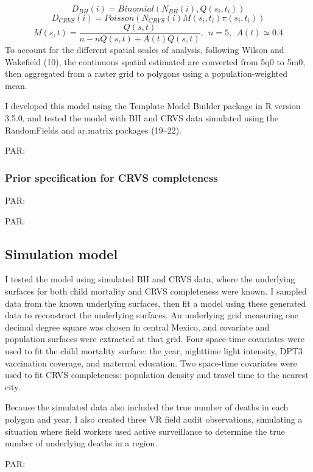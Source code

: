 \documentclass[
]{article}
\begin{document}
\[D_{BH}(i) = Binomial(N_{BH}(i), Q(s_i, t_i))\]
\[D_{CRVS}(i) = Poisson(N_{CRVS}(i)M(s_i, t_i)\pi(s_i, t_i))\]
\[M(s,t) = \dfrac{Q(s,t)}{n - nQ(s,t) + A(t)Q(s,t)},~~n = 5,~~A(t) \simeq 0.4\]
To account for the different spatial scales of analysis, following Wilson and Wakefield (10), the continuous spatial estimated are converted from 5q0 to 5m0, then aggregated from a raster grid to polygons using a population-weighted mean.

I developed this model using the Template Model Builder package in R version 3.5.0, and tested the model with BH and CRVS data simulated using the RandomFields and ar.matrix packages (19--22).

PAR:

\hypertarget{prior-specification-for-crvs-completeness}{%
\subsubsection{Prior specification for CRVS completeness}\label{prior-specification-for-crvs-completeness}}

PAR:

PAR:

\hypertarget{simulation-model}{%
\subsection{Simulation model}\label{simulation-model}}

I tested the model using simulated BH and CRVS data, where the underlying surfaces for both child mortality and CRVS completeness were known. I sampled data from the known underlying surfaces, then fit a model using these generated data to reconstruct the underlying surfaces. An underlying grid measuring one decimal degree square was chosen in central Mexico, and covariate and population surfaces were extracted at that grid. Four space-time covariates were used to fit the child mortality surface: the year, nighttime light intensity, DPT3 vaccination coverage, and maternal education. Two space-time covariates were used to fit CRVS completeness: population density and travel time to the nearest city.

Because the simulated data also included the true number of deaths in each polygon and year, I also created three VR field audit observations, simulating a situation where field workers used active surveillance to determine the true number of underlying deaths in a region.

PAR:
\end{document}
